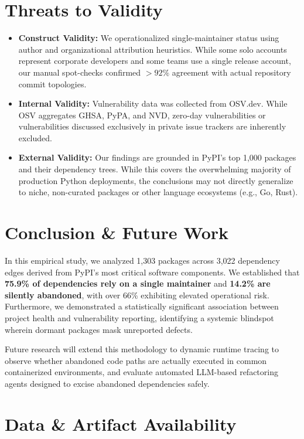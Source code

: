 \documentclass[conference]{IEEEtran}
\begin{document}
\section{Threats to Validity}

\begin{itemize}
    \item \textbf{Construct Validity:} We operationalized single-maintainer status using author and organizational attribution heuristics. While some solo accounts represent corporate developers and some teams use a single release account, our manual spot-checks confirmed $>92\%$ agreement with actual repository commit topologies.
    \item \textbf{Internal Validity:} Vulnerability data was collected from OSV.dev. While OSV aggregates GHSA, PyPA, and NVD, zero-day vulnerabilities or vulnerabilities discussed exclusively in private issue trackers are inherently excluded.
    \item \textbf{External Validity:} Our findings are grounded in PyPI's top 1,000 packages and their dependency trees. While this covers the overwhelming majority of production Python deployments, the conclusions may not directly generalize to niche, non-curated packages or other language ecosystems (e.g., Go, Rust).
\end{itemize}

\section{Conclusion \& Future Work}

In this empirical study, we analyzed 1,303 packages across 3,022 dependency edges derived from PyPI's most critical software components. We established that \textbf{75.9\% of dependencies rely on a single maintainer} and \textbf{14.2\% are silently abandoned}, with over 66\% exhibiting elevated operational risk. Furthermore, we demonstrated a statistically significant association between project health and vulnerability reporting, identifying a systemic blindspot wherein dormant packages mask unreported defects.

Future research will extend this methodology to dynamic runtime tracing to observe whether abandoned code paths are actually executed in common containerized environments, and evaluate automated LLM-based refactoring agents designed to excise abandoned dependencies safely.

\section*{Data \& Artifact Availability}
\end{document}
